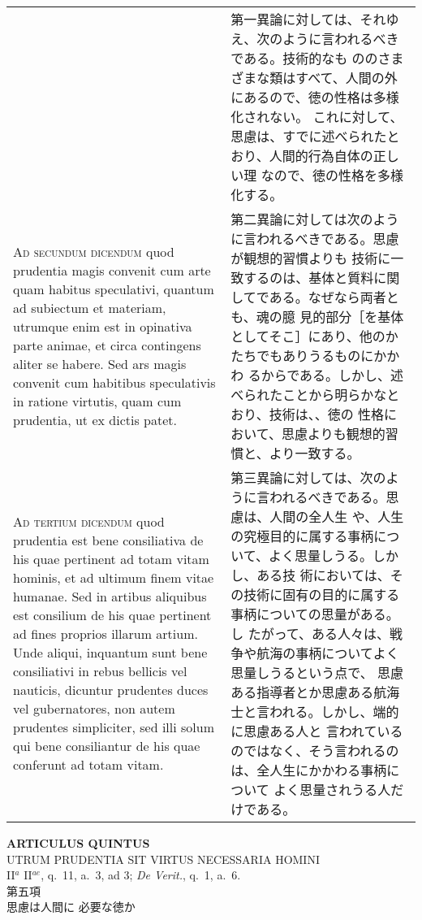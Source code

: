 \documentclass[10pt]{jsarticle}
\begin{document}
\begin{longtable}{p{21em}p{21em}}
&

第一異論に対しては、それゆえ、次のように言われるべきである。技術的なも
ののさまざまな類はすべて、人間の外にあるので、徳の性格は多様化されない。
これに対して、思慮は、すでに述べられたとおり、人間的行為自体の正しい理
なので、徳の性格を多様化する。

\\

{\scshape Ad secundum dicendum} quod prudentia magis convenit cum arte
 quam habitus speculativi, quantum ad subiectum et materiam, utrumque
 enim est in opinativa parte animae, et circa contingens aliter se
 habere. Sed ars magis convenit cum habitibus speculativis in ratione
 virtutis, quam cum prudentia, ut ex dictis patet.

&

第二異論に対しては次のように言われるべきである。思慮が観想的習慣よりも
技術に一致するのは、基体と質料に関してである。なぜなら両者とも、魂の臆
見的部分［を基体としてそこ］にあり、他のかたちでもありうるものにかかわ
るからである。しかし、述べられたことから明らかなとおり、技術は、、徳の
性格において、思慮よりも観想的習慣と、より一致する。

\\

{\scshape Ad tertium dicendum} quod prudentia est bene consiliativa de
his quae pertinent ad totam vitam hominis, et ad ultimum finem vitae
humanae. Sed in artibus aliquibus est consilium de his quae pertinent
ad fines proprios illarum artium. Unde aliqui, inquantum sunt bene
consiliativi in rebus bellicis vel nauticis, dicuntur prudentes duces
vel gubernatores, non autem prudentes simpliciter, sed illi solum qui
bene consiliantur de his quae conferunt ad totam vitam.

&

第三異論に対しては、次のように言われるべきである。思慮は、人間の全人生
や、人生の究極目的に属する事柄について、よく思量しうる。しかし、ある技
術においては、その技術に固有の目的に属する事柄についての思量がある。し
たがって、ある人々は、戦争や航海の事柄についてよく思量しうるという点で、
思慮ある指導者とか思慮ある航海士と言われる。しかし、端的に思慮ある人と
言われているのではなく、そう言われるのは、全人生にかかわる事柄について
よく思量されうる人だけである。

\end{longtable}
\newpage

\begin{center}
 {\Large {\bf ARTICULUS QUINTUS}}\\ {\large UTRUM PRUDENTIA SIT VIRTUS
 NECESSARIA HOMINI}\\ {\footnotesize II$^a$ II$^{ae}$, q.~11, a.~3, ad
 3; {\itshape De Verit.}, q.~1, a.~6.}\\ {\Large 第五項\\思慮は人間に
 必要な徳か}
\end{center}
\end{document}
